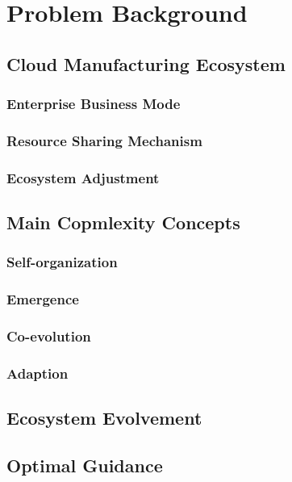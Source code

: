 \section{Problem Background} %
\label{sec:problem_background}

\subsection{Cloud Manufacturing Ecosystem} %
\label{sub:cloud_manufacturing_ecosystem}

\subsubsection{Enterprise Business Mode}

\subsubsection{Resource Sharing Mechanism}

\subsubsection{Ecosystem Adjustment}


\subsection{Main Copmlexity Concepts} %
\label{sub:main_copmlexity_concepts}

\subsubsection{Self-organization}

\subsubsection{Emergence}

\subsubsection{Co-evolution}

\subsubsection{Adaption}

\subsection{Ecosystem Evolvement} %
\label{sub:ecosystem_evolvement}


\subsection{Optimal Guidance} %
\label{sub:optimal_guidance}


